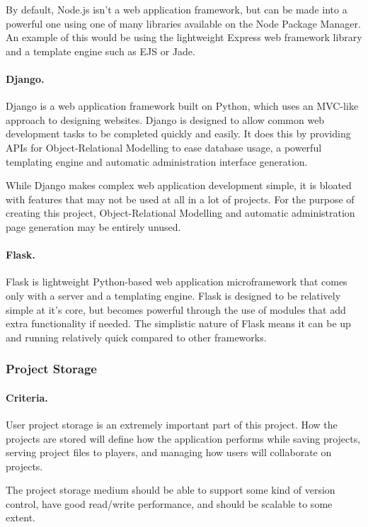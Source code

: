 \documentclass[a4paper, 12pt]{article}
\begin{document}
By default, Node.js isn't a web application framework, but can be made into a powerful one using one of many libraries available on the Node Package Manager.\cite{npmjs} An example of this would be using the lightweight Express web framework library and a template engine such as EJS or Jade.

\paragraph{Django.}
Django is a web application framework built on Python, which uses an MVC-like approach to designing websites.\cite{django} Django is designed to allow common web development tasks to be completed quickly and easily. It does this by providing APIs for Object-Relational Modelling to ease database usage, a powerful templating engine and automatic administration interface generation.\cite{djangooverview}

While Django makes complex web application development simple, it is bloated with features that may not be used at all in a lot of projects. For the purpose of creating this project, Object-Relational Modelling and automatic administration page generation may be entirely unused. 

\paragraph{Flask.}
Flask is lightweight Python-based web application microframework that comes only with a server and a templating engine. Flask is designed to be relatively simple at it's core, but becomes powerful through the use of modules that add extra functionality if needed.\cite{flask} The simplistic nature of Flask means it can be up and running relatively quick compared to other frameworks.

\subsubsection{Project Storage}
\paragraph{Criteria.}
User project storage is an extremely important part of this project. How the projects are stored will define how the application performs while saving projects, serving project files to players, and managing how users will collaborate on projects.

The project storage medium should be able to support some kind of version control, have good read/write performance, and should be scalable to some extent.
\end{document}
